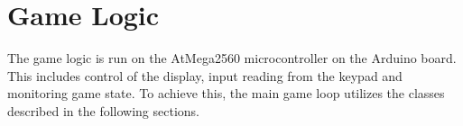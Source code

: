 \section{Game Logic}
The game logic is run on the AtMega2560 microcontroller on the Arduino board. This includes control of the display, input reading from the keypad and monitoring game state. To achieve this, the main game loop utilizes the classes described in the following sections.





